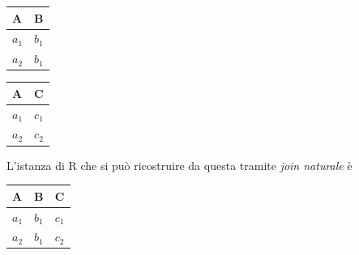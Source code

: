     \begin{multicols}{2}   
    \begin{flushright}
    \begin{tabular}{l|l}
     A & B \\
     \hline
     $a_1$ & $b_1$\\
     $a_2$ & $b_1$
    \end{tabular}
    \end{flushright}

    \begin{flushleft}
    \begin{tabular}{l|l}
     A & C \\
     \hline
     $a_1$ & $c_1$\\
     $a_2$ & $c_2$
    \end{tabular}
    \end{flushleft}
    \end{multicols}  
 
  L'istanza di R che si può ricostruire da questa tramite \emph{join naturale} è\\
    \begin{center}
    \begin{tabular}{l|l|l}
     A & B & C \\
     \hline
     $a_1$ &$b_1$ & $c_1$\\
     $a_2$ &$b_1$ & $c_2$
    \end{tabular}
    \end{center}
    

